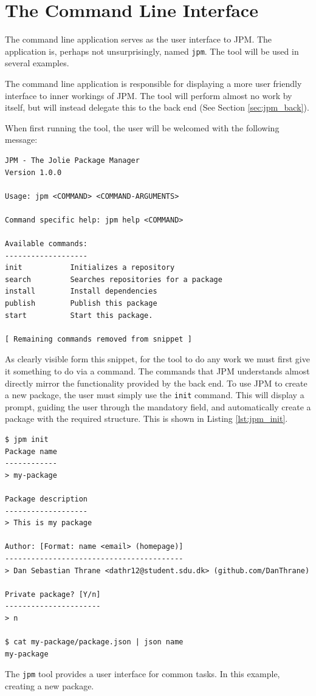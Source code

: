 \section{The Command Line Interface}
\label{sec:cli}

The command line application serves as the user interface to JPM. The
application is, perhaps not unsurprisingly, named \texttt{jpm}. The
tool will be used in several examples.

The command line application is responsible for displaying a more user friendly
interface to inner workings of JPM. The tool will perform almost no work by
itself, but will instead delegate this to the back end (See Section
\ref{sec:jpm_back}).

When first running the tool, the user will be welcomed with the following
message:

\begin{verbatim}
JPM - The Jolie Package Manager
Version 1.0.0

Usage: jpm <COMMAND> <COMMAND-ARGUMENTS>

Command specific help: jpm help <COMMAND>

Available commands:
-------------------
init           Initializes a repository
search         Searches repositories for a package
install        Install dependencies
publish        Publish this package
start          Start this package.

[ Remaining commands removed from snippet ]
\end{verbatim}

As clearly visible form this snippet, for the tool to do any work we must first
give it something to do via a command. The commands that JPM understands almost
directly mirror the functionality provided by the back end. To use JPM to
create a new package, the user must simply use the \texttt{init}
command. This will display a prompt, guiding the user through the mandatory
field, and automatically create a package with the required structure. This
is shown in Listing \ref{lst:jpm_init}.

\begin{listing}[H]
\begin{verbatim}
$ jpm init
Package name
------------
> my-package

Package description
-------------------
> This is my package

Author: [Format: name <email> (homepage)]
-----------------------------------------
> Dan Sebastian Thrane <dathr12@student.sdu.dk> (github.com/DanThrane)

Private package? [Y/n]
----------------------
> n

$ cat my-package/package.json | json name
my-package
\end{verbatim}

\caption{The \texttt{jpm} tool provides a user interface for common
    tasks. In this example, creating a new package.}

\label{lst:jpm_init}

\end{listing}

